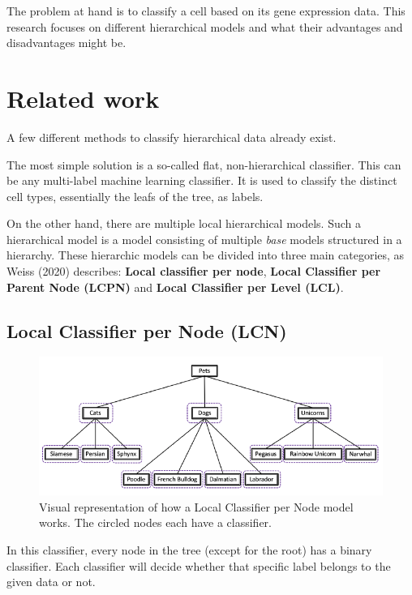 \documentclass{article}
\begin{document}
The problem at hand is to classify a cell based on its gene expression data.
This research focuses on different hierarchical models and what their advantages and disadvantages might be. 

\section{Related work}

A few different methods to classify hierarchical data already exist.

The most simple solution is a so-called flat, non-hierarchical classifier. This can be any multi-label machine learning classifier. It is used to classify the distinct cell types, essentially the leafs of the tree, as labels.

On the other hand, there are multiple local hierarchical models.
Such a hierarchical model is a model consisting of multiple \textit{base} models structured in a hierarchy.
These hierarchic models can be divided into three main categories, as Weiss (2020) describes:
\textbf{Local classifier per node}, \textbf{Local Classifier per Parent Node (LCPN)} and \textbf{Local Classifier per Level (LCL)}.

\subsection{Local Classifier per Node (LCN)}
\label{LCN}
\begin{figure}[ht]
\vskip 0.2in
\begin{center}
\centerline{\includegraphics[width=\columnwidth]{images/lcn.png}}
\caption{Visual representation of how a Local Classifier per Node model works. The circled nodes each have a classifier.}
\label{lcn}
\end{center}
\vskip -0.2in
\end{figure}

In this classifier, every node in the tree (except for the root) has a binary classifier.
Each classifier will decide whether that specific label belongs to the given data or not.
\end{document}
